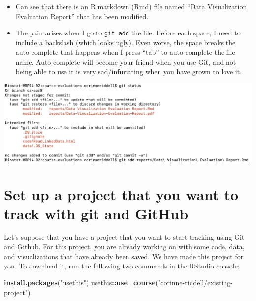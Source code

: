 \documentclass[
]{book}
\newenvironment{Shaded}{\begin{snugshade}}{\end{snugshade}}
\newcommand{\FunctionTok}[1]{\textcolor[rgb]{0.13,0.29,0.53}{\textbf{#1}}}
\newcommand{\NormalTok}[1]{#1}
\newcommand{\SpecialCharTok}[1]{\textcolor[rgb]{0.81,0.36,0.00}{\textbf{#1}}}
\newcommand{\StringTok}[1]{\textcolor[rgb]{0.31,0.60,0.02}{#1}}
\providecommand{\tightlist}{%
  \setlength{\itemsep}{0pt}\setlength{\parskip}{0pt}}
\begin{document}
\begin{itemize}
\tightlist
\item
  Can see that there is an R markdown (Rmd) file named ``Data Visualization Evaluation Report'' that has been modified.
\item
  The pain arises when I go to \texttt{git\ add} the file. Before each space, I need to
  include a backslash (which looks ugly). Even worse, the space breaks the auto-complete that happens when I press ``tab'' to auto-complete the file name.
  Auto-complete will become your friend when you use Git, and not being able to
  use it is very sad/infuriating when you have grown to love it.
\end{itemize}

\includegraphics[width=1\linewidth]{./figures/Space-in-pathways-pain}

\hypertarget{set-up-a-project-that-you-want-to-track-with-git-and-github}{%
\section{Set up a project that you want to track with git and GitHub}\label{set-up-a-project-that-you-want-to-track-with-git-and-github}}

Let's suppose that you have a project that you want to start tracking using Git
and Github. For this project, you are already working on with some code, data,
and visualizations that have already been saved. We have made this project for
you. To download it, run the following two commands in the RStudio console:

\begin{Shaded}
\begin{Highlighting}[]
\FunctionTok{install.packages}\NormalTok{(}\StringTok{"usethis"}\NormalTok{)}
\NormalTok{usethis}\SpecialCharTok{::}\FunctionTok{use\_course}\NormalTok{(}\StringTok{"corinne{-}riddell/existing{-}project"}\NormalTok{)}
\end{Highlighting}
\end{Shaded}
\end{document}

